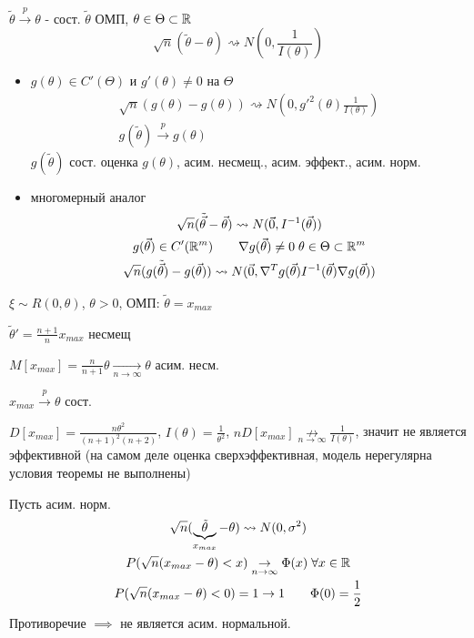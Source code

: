 \documentclass{article}
\begin{document}
\begin{corollary}
  $\tilde{\theta}\overset{p}{\to}\theta$ - сост. $\tilde{\theta}$ ОМП, $\theta \in \Theta \subset \mathbb{R}$
\[
  \sqrt{n}(\tilde{\theta}-\theta) \rightsquigarrow N(0, \frac{1}{I(\theta)})
\]
  \begin{itemize}
    \item $g(\theta)\in C'(\Theta)$ и $g'(\theta)\neq 0$ на $\Theta$
      \begin{gather*}
        \sqrt{n}(g(\theta)-g(\theta)) \rightsquigarrow N(0, g'^{2}(\theta)\frac{1}{I(\theta)}) \\ 
        g(\tilde{\theta}) \overset{p}{\to} g(\theta)
      \end{gather*}
      $g(\tilde{\theta})$ сост. оценка $g(\theta)$, асим. несмещ., асим. эффект., асим. норм.
    \item многомерный аналог
      \begin{gather*}
        \sqrt{n}(\tilde{\vec{\theta}}-\vec{\theta}) \rightsquigarrow N(\vec{0}, I^{-1}(\vec{\theta})) \\ 
        g(\vec{\theta}) \in C'(\mathbb{R}^{m}) \qquad \nabla g(\vec{\theta}) \neq 0 \; \theta \in \Theta \subset \mathbb{R}^{m} \\ 
        \sqrt{n}(g(\tilde{\vec{\theta}})-g(\vec{\theta})) \rightsquigarrow N(\vec{0}, \nabla ^{T} g(\vec{\theta})I^{-1}(\vec{\theta})\nabla g(\vec{\theta}))
      \end{gather*}
  \end{itemize}
\end{corollary}
\begin{eg}
  $\xi \sim R(0,\theta)$, $\theta>0$, ОМП: $\tilde{\theta}=x_{max}$

  $\tilde{\theta}'=\frac{n+1}{n}x_{max}$ несмещ

  $M[x_{max}]=\frac{n}{n+1}\theta \underset{n\to\infty}{\to} \theta$ асим. несм.

  $x_{max} \overset{p}{\to} \theta$ сост.

  $D[x_{max}]=\frac{n\theta^{2}}{(n+1)^{2}(n+2)}$, $I(\theta)=\frac{1}{\theta^{2}}$,
  $nD[x_{max}] \underset{n\to\infty}{\not \to}\frac{1}{I(\theta)}$,
  значит не является эффективной
  (на самом деле оценка сверхэффективная, модель нерегулярна условия теоремы не выполнены)

  Пусть асим. норм.
  \begin{gather*}
    \sqrt{n}(\underbrace{\tilde{\theta}}_{x_{max}}-\theta) \rightsquigarrow N(0,\sigma^{2}) \\ 
    P(\sqrt{n}(x_{max}-\theta) < x) \underset{n\to\infty}{\to} \Phi(x) \; \forall x\in \mathbb{R} \\ 
    P(\sqrt{n}(x_{max}-\theta)<0)=1 \to 1 \qquad \Phi(0)=\frac{1}{2} 
  \end{gather*}
  Противоречие $\implies$ не является асим. нормальной.
\end{eg}
\end{document}
